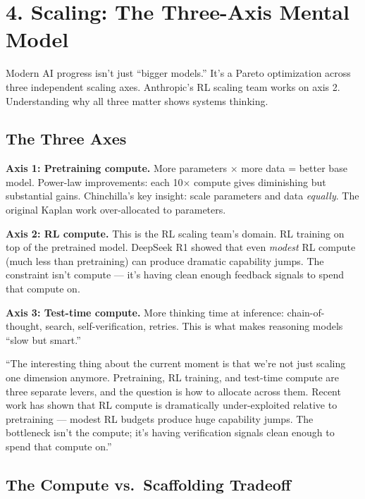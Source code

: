 \section{4. Scaling: The Three-Axis Mental Model}

\begin{bluf}
Modern AI progress isn't just ``bigger models.'' It's a Pareto optimization across three independent scaling axes. Anthropic's RL scaling team works on axis 2. Understanding why all three matter shows systems thinking.
\end{bluf}

\subsection{The Three Axes}

\textbf{Axis 1: Pretraining compute.} More parameters $\times$ more data = better base model. Power-law improvements: each 10$\times$ compute gives diminishing but substantial gains. Chinchilla's key insight: scale parameters and data \textit{equally}. The original Kaplan work over-allocated to parameters.

\textbf{Axis 2: RL compute.} This is the RL scaling team's domain. RL training on top of the pretrained model. DeepSeek R1 showed that even \textit{modest} RL compute (much less than pretraining) can produce dramatic capability jumps. The constraint isn't compute --- it's having clean enough feedback signals to spend that compute on.

\textbf{Axis 3: Test-time compute.} More thinking time at inference: chain-of-thought, search, self-verification, retries. This is what makes reasoning models ``slow but smart.''

\begin{sayit}[Scaling]
``The interesting thing about the current moment is that we're not just scaling one dimension anymore. Pretraining, RL training, and test-time compute are three separate levers, and the question is how to allocate across them. Recent work has shown that RL compute is dramatically under-exploited relative to pretraining --- modest RL budgets produce huge capability jumps. The bottleneck isn't the compute; it's having verification signals clean enough to spend that compute on.''
\end{sayit}

\subsection{The Compute vs.\ Scaffolding Tradeoff}

